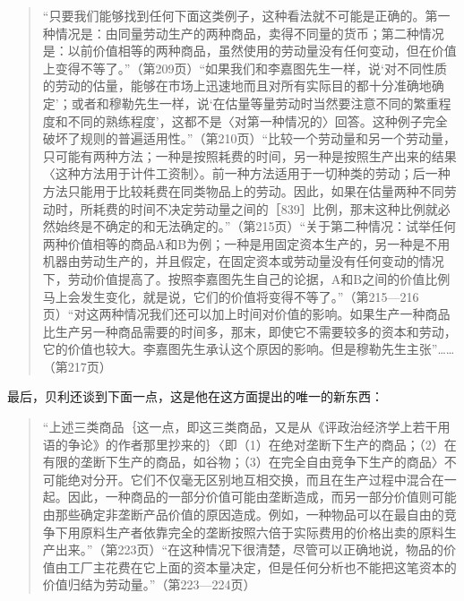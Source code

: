 \begin{quote}{“只要我们能够找到任何下面这类例子，这种看法就不可能是正确的。第一种情况是：由同量劳动生产的两种商品，卖得不同量的货币；第二种情况是：以前价值相等的两种商品，虽然使用的劳动量没有任何变动，但在价值上变得不等了。”（第209页）“如果我们和李嘉图先生一样，说‘对不同性质的劳动的估量，能够在市场上迅速地而且对所有实际目的都十分准确地确定’；或者和穆勒先生一样，说‘在估量等量劳动时当然要注意不同的繁重程度和不同的熟练程度’，这都不是〈对第一种情况的〉回答。这种例子完全破坏了规则的普遍适用性。”（第210页）“比较一个劳动量和另一个劳动量，只可能有两种方法；一种是按照耗费的时间，另一种是按照生产出来的结果〈这种方法用于计件工资制〉。前一种方法适用于一切种类的劳动；后一种方法只能用于比较耗费在同类物品上的劳动。因此，如果在估量两种不同劳动时，所耗费的时间不决定劳动量之间的［839］比例，那末这种比例就必然始终是不确定的和无法确定的。”（第215页）“关于第二种情况：试举任何两种价值相等的商品A和B为例；一种是用固定资本生产的，另一种是不用机器由劳动生产的，并且假定，在固定资本或劳动量没有任何变动的情况下，劳动价值提高了。按照李嘉图先生自己的论据，A和B之间的价值比例马上会发生变化，就是说，它们的价值将变得不等了。”（第215—216页）“对这两种情况我们还可以加上时间对价值的影响。如果生产一种商品比生产另一种商品需要的时间多，那末，即使它不需要较多的资本和劳动，它的价值也较大。李嘉图先生承认这个原因的影响。但是穆勒先生主张”……（第217页）}\end{quote}

最后，贝利还谈到下面一点，这是他在这方面提出的唯一的新东西：

\begin{quote}{“上述三类商品｛这一点，即这三类商品，又是从《评政治经济学上若干用语的争论》的作者那里抄来的｝〈即（1）在绝对垄断下生产的商品；（2）在有限的垄断下生产的商品，如谷物；（3）在完全自由竞争下生产的商品〉不可能绝对分开。它们不仅毫无区别地互相交换，而且在生产过程中混合在一起。因此，一种商品的一部分价值可能由垄断造成，而另一部分价值则可能由那些确定非垄断产品价值的原因造成。例如，一种物品可以在最自由的竞争下用原料生产者依靠完全的垄断按照六倍于实际费用的价格出卖的原料生产出来。”（第223页）“在这种情况下很清楚，尽管可以正确地说，物品的价值由工厂主花费在它上面的资本量决定，但是任何分析也不能把这笔资本的价值归结为劳动量。”（第223—224页）}\end{quote}

